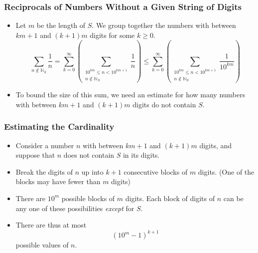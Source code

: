 \documentclass{beamer}
\begin{document}
\begin{frame}
    \frametitle{Reciprocals of Numbers Without a Given String of Digits}

    \begin{itemize}
        \item Let $m$ be the length of $S$. We group together the numbers with between $km + 1$ and $(k + 1)m$ digits for some $k \geq 0$.
        \[
            \sum_{n \not\in \mathbb{N}_S} \frac{1}{n} = \sum_{k = 0}^{\infty} \left( \sum_{\substack{10^{km} \leq n < 10^{km + 1} \\ n \not\in \mathbb{N}_S}} \frac{1}{n} \right) \leq \sum_{k = 0}^{\infty} \left( \sum_{\substack{10^{km} \leq n < 10^{km + 1} \\ n \not\in \mathbb{N}_S}} \frac{1}{10^{km}} \right)
        \]
        \pause
        \item To bound the size of this sum, we need an estimate for how many numbers with between $km + 1$ and $(k + 1)m$ digits do not contain $S$. 
    \end{itemize}    

\end{frame}

\begin{frame}
    \frametitle{Estimating the Cardinality}

    \begin{itemize}
        \item Consider a number $n$ with between $km + 1$ and $(k + 1)m$ digits, and suppose that $n$ does not contain $S$ in its digits. \pause
        \item Break the digits of $n$ up into $k + 1$ consecutive blocks of $m$ digits. (One of the blocks may have fewer than $m$ digits) \pause
        \item There are $10^m$ possible blocks of $m$ digits. Each block of digits of $n$ can be any one of these possibilities \emph{except} for $S$. \pause
        \item There are thus at most
        \[
            \left( 10^m - 1 \right)^{k + 1}    
        \]
        possible values of $n$.
    \end{itemize} 

\end{frame}
\end{document}
